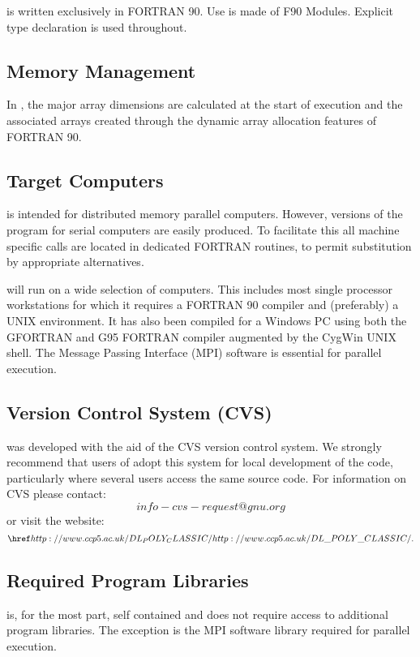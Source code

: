 \D{} is written exclusively in FORTRAN 90. Use is made
of F90 Modules. Explicit type declaration is used throughout.

\subsection{Memory Management}

In \D{}, the major array dimensions are calculated at
the start of execution and the associated arrays created through the
dynamic array allocation features of FORTRAN 90.

\subsection{Target Computers}

\D{} is intended for distributed memory parallel computers.
However, versions of the program for serial computers are easily
produced. To facilitate this all machine specific calls are located in
dedicated FORTRAN routines, to permit substitution
by appropriate alternatives.

\D{} will run on a wide selection of computers. This includes most single
processor workstations for which it requires a FORTRAN 90 compiler and
(preferably) a UNIX environment. It has also been compiled for a Windows PC
using both the GFORTRAN and G95 FORTRAN compiler augmented by the CygWin UNIX
shell.  The Message Passing Interface (MPI) software is essential for parallel
execution.

\subsection{Version Control System (CVS)}

\D{} was developed with the aid of the CVS version
control system. We strongly recommend that users of \D{} adopt this
system for local development of the \D{} code, particularly where
several users access the same source code. For information on
CVS please contact:\[info-cvs-request@gnu.org\] or visit
the website: \[\WEB{}.\index{WWW}\]

\subsection{Required Program Libraries}

\D{} is, for the most part, self contained and does not require access
to additional program libraries. The exception is the MPI software
library required for parallel execution.  

